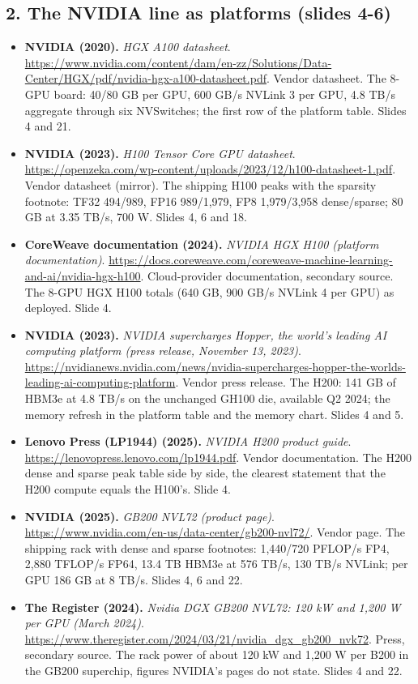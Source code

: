 \subsection*{2. The NVIDIA line as platforms (slides 4-6)}
\begin{itemize}[leftmargin=1.2em,itemsep=3pt]\sloppy
\item \textbf{NVIDIA (2020).} \textit{HGX A100 datasheet}. \url{https://www.nvidia.com/content/dam/en-zz/Solutions/Data-Center/HGX/pdf/nvidia-hgx-a100-datasheet.pdf}. Vendor datasheet. The 8-GPU board: 40/80 GB per GPU, 600 GB/s NVLink 3 per GPU, 4.8 TB/s aggregate through six NVSwitches; the first row of the platform table. Slides 4 and 21.
\item \textbf{NVIDIA (2023).} \textit{H100 Tensor Core GPU datasheet}. \url{https://openzeka.com/wp-content/uploads/2023/12/h100-datasheet-1.pdf}. Vendor datasheet (mirror). The shipping H100 peaks with the sparsity footnote: TF32 494/989, FP16 989/1,979, FP8 1,979/3,958 dense/sparse; 80 GB at 3.35 TB/s, 700 W. Slides 4, 6 and 18.
\item \textbf{CoreWeave documentation (2024).} \textit{NVIDIA HGX H100 (platform documentation)}. \url{https://docs.coreweave.com/coreweave-machine-learning-and-ai/nvidia-hgx-h100}. Cloud-provider documentation, secondary source. The 8-GPU HGX H100 totals (640 GB, 900 GB/s NVLink 4 per GPU) as deployed. Slide 4.
\item \textbf{NVIDIA (2023).} \textit{NVIDIA supercharges Hopper, the world's leading AI computing platform (press release, November 13, 2023)}. \url{https://nvidianews.nvidia.com/news/nvidia-supercharges-hopper-the-worlds-leading-ai-computing-platform}. Vendor press release. The H200: 141 GB of HBM3e at 4.8 TB/s on the unchanged GH100 die, available Q2 2024; the memory refresh in the platform table and the memory chart. Slides 4 and 5.
\item \textbf{Lenovo Press (LP1944) (2025).} \textit{NVIDIA H200 product guide}. \url{https://lenovopress.lenovo.com/lp1944.pdf}. Vendor documentation. The H200 dense and sparse peak table side by side, the clearest statement that the H200 compute equals the H100's. Slide 4.
\item \textbf{NVIDIA (2025).} \textit{GB200 NVL72 (product page)}. \url{https://www.nvidia.com/en-us/data-center/gb200-nvl72/}. Vendor page. The shipping rack with dense and sparse footnotes: 1,440/720 PFLOP/s FP4, 2,880 TFLOP/s FP64, 13.4 TB HBM3e at 576 TB/s, 130 TB/s NVLink; per GPU 186 GB at 8 TB/s. Slides 4, 6 and 22.
\item \textbf{The Register (2024).} \textit{Nvidia DGX GB200 NVL72: 120 kW and 1,200 W per GPU (March 2024)}. \url{https://www.theregister.com/2024/03/21/nvidia_dgx_gb200_nvk72}. Press, secondary source. The rack power of about 120 kW and 1,200 W per B200 in the GB200 superchip, figures NVIDIA's pages do not state. Slides 4 and 22.

\end{itemize}
